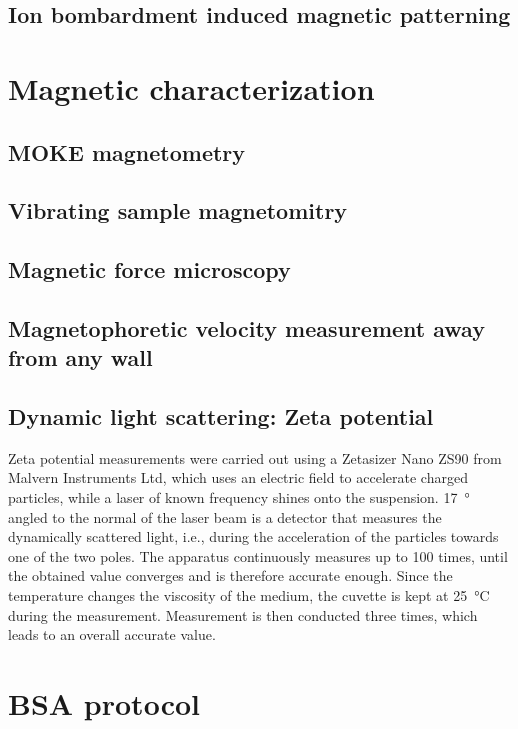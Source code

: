\subsection{Ion bombardment induced magnetic patterning}


\section{Magnetic characterization}

\subsection{MOKE magnetometry}

\subsection{Vibrating sample magnetomitry}

\subsection{Magnetic force microscopy}

\subsection{Magnetophoretic velocity measurement away from any wall}

\subsection{Dynamic light scattering: Zeta potential}
Zeta potential measurements were carried out using a Zetasizer Nano ZS90 from Malvern Instruments Ltd, which uses an electric field to accelerate charged particles, while a laser of known frequency shines onto the suspension.
\SI{17}{\degree} angled to the normal of the laser beam is a detector that measures the dynamically scattered light, i.e., during the acceleration of the particles towards one of the two poles.
The apparatus continuously measures up to 100 times, until the obtained value converges and is therefore accurate enough. 
Since the temperature changes the viscosity of the medium, the cuvette is kept at \SI{25}{\celsius} during the measurement. 
Measurement is then conducted three times, which leads to an overall accurate value. 



\section{BSA protocol}



